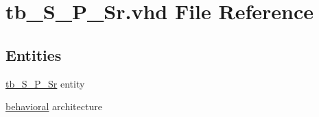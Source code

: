 \hypertarget{tb___s___p___sr_8vhd}{}\section{tb\+\_\+\+S\+\_\+\+P\+\_\+\+Sr.\+vhd File Reference}
\label{tb___s___p___sr_8vhd}
\subsection*{Entities}
\begin{DoxyCompactItemize}
\item 
\hyperlink{classtb___s___p___sr}{tb\+\_\+\+S\+\_\+\+P\+\_\+\+Sr} entity
\item 
\hyperlink{classtb___s___p___sr_1_1behavioral}{behavioral} architecture
\end{DoxyCompactItemize}
